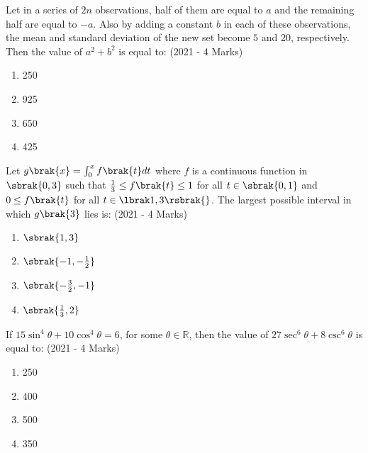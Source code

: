\item{
        	
        	Let in a series of $2n$ observations, half of them are equal to $a$ and the remaining half are equal to $-a$. Also by adding a constant $b$ in each of these observations, the mean and standard deviation of the new set become $5$ and $20$, respectively. Then the value of $a^2 + b^2$ is equal to:
        	\hfill
        	{(2021 - 4 Marks)}
        	\begin{multicols}{4}
        		\begin{enumerate}
        			\item 250
        			\item 925
        			\item 650
        			\item 425
        		\end{enumerate}
        	\end{multicols}
        	
        }
    \item{
     
            Let $g\brak{x} = \int_{0}^{x} f\brak{t} dt$ where $f$ is a continuous function in $\sbrak{0, 3}$ such that $\frac{1}{3} \leq f\brak{t} \leq 1$ for all $t \in \sbrak{0, 1}$ and $0 \leq f\brak{t}$ for all $t \in \lbrak1, 3\rsbrak{}$. The largest possible interval in which $g\brak{3}$ lies is:\hfill
                {(2021 - 4 Marks)}
            \begin{multicols}{4}
                \begin{enumerate}
                    \item $\sbrak{1, 3}$
                    
                    \item $\sbrak{-1, -\frac{1}{2}}$
                    
                    \item $\sbrak{-\frac{3}{2}, -1}$
                    
                    \item $\sbrak{\frac{1}{3}, 2}$
                \end{enumerate}
            \end{multicols}
        
        }
    \item{
            If $15 \sin^4 \theta + 10 \cos^4 \theta = 6$, for some $\theta \in \mathbb{R}$, then the value of $27 \sec^6 \theta + 8 \csc^6 \theta$ is equal to:
           	\hfill
                {(2021 - 4 Marks)}
            
            \begin{multicols}{4}
				\begin{enumerate}
					\item 250
					\item 400
					\item 500
					\item 350
				\end{enumerate}
			\end{multicols}
        
        }
